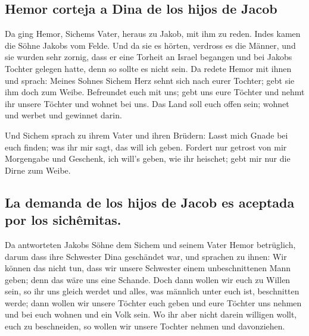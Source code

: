 \hypertarget{hemor-corteja-a-dina-de-los-hijos-de-jacob}{%
\subsection{Hemor corteja a Dina de los hijos de
Jacob}\label{hemor-corteja-a-dina-de-los-hijos-de-jacob}}

 Da ging Hemor, Sichems Vater, heraus zu Jakob, mit ihm zu
reden.  Indes kamen die Söhne Jakobs vom Felde. Und da sie
es hörten, verdross es die Männer, und sie wurden sehr zornig, dass er
eine Torheit an Israel begangen und bei Jakobs Tochter gelegen hatte,
denn so sollte es nicht sein.  Da redete Hemor mit ihnen
und sprach: Meines Sohnes Sichem Herz sehnt sich nach eurer Tochter;
gebt sie ihm doch zum Weibe.  Befreundet euch mit uns;
gebt uns eure Töchter und nehmt ihr unsere Töchter  und
wohnet bei uns. Das Land soll euch offen sein; wohnet und werbet und
gewinnet darin.

 Und Sichem sprach zu ihrem Vater und ihren Brüdern:
Lasst mich Gnade bei euch finden; was ihr mir sagt, das will ich geben.
 Fordert nur getrost von mir Morgengabe und Geschenk, ich
will's geben, wie ihr heischet; gebt mir nur die Dirne zum Weibe.

\hypertarget{la-demanda-de-los-hijos-de-jacob-es-aceptada-por-los-sichuxeamitas.}{%
\subsection{La demanda de los hijos de Jacob es aceptada por los
sichêmitas.}\label{la-demanda-de-los-hijos-de-jacob-es-aceptada-por-los-sichuxeamitas.}}

 Da antworteten Jakobs Söhne dem Sichem und seinem Vater
Hemor betrüglich, darum dass ihre Schwester Dina geschändet war,
 und sprachen zu ihnen: Wir können das nicht tun, dass
wir unsere Schwester einem unbeschnittenen Mann geben; denn das wäre uns
eine Schande.  Doch dann wollen wir euch zu Willen sein,
so ihr uns gleich werdet und alles, was männlich unter euch ist,
beschnitten werde;  dann wollen wir unsere Töchter euch
geben und eure Töchter uns nehmen und bei euch wohnen und ein Volk sein.
 Wo ihr aber nicht darein willigen wollt, euch zu
beschneiden, so wollen wir unsere Tochter nehmen und davonziehen.

